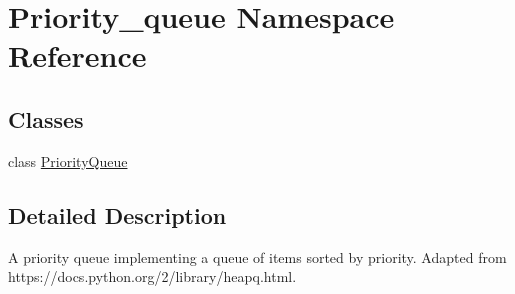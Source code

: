 \hypertarget{namespace_priority__queue}{}\section{Priority\+\_\+queue Namespace Reference}
\label{namespace_priority__queue}
\subsection*{Classes}
\begin{DoxyCompactItemize}
\item 
class \hyperlink{class_priority__queue_1_1_priority_queue}{Priority\+Queue}
\end{DoxyCompactItemize}


\subsection{Detailed Description}
\begin{DoxyVerb}A priority queue implementing a queue of items sorted by priority.
Adapted from https://docs.python.org/2/library/heapq.html.
\end{DoxyVerb}
 